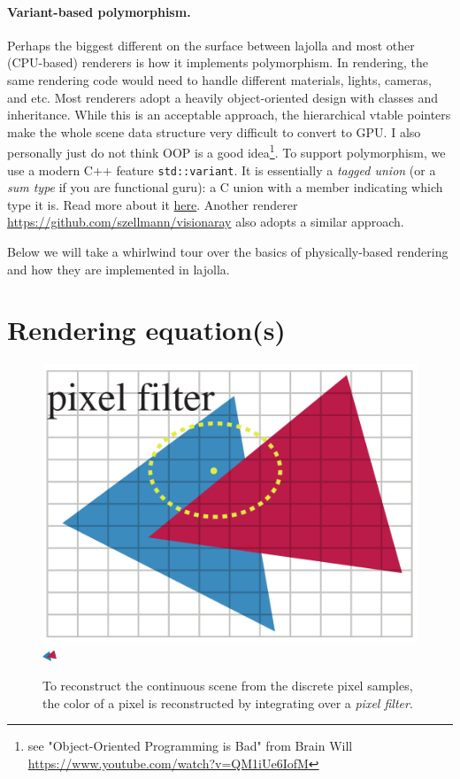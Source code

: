 \documentclass{article}
\begin{document}
\paragraph{Variant-based polymorphism.} Perhaps the biggest different on the surface between lajolla and most other (CPU-based) renderers is how it implements polymorphism. In rendering, the same rendering code would need to handle different materials, lights, cameras, and etc. Most renderers adopt a heavily object-oriented design with classes and inheritance. While this is an acceptable approach, the hierarchical vtable pointers make the whole scene data structure very difficult to convert to GPU. I also personally just do not think OOP is a good idea\footnote{see "Object-Oriented Programming is Bad" from Brain Will \url{https://www.youtube.com/watch?v=QM1iUe6IofM}}. To support polymorphism, we use a modern C++ feature \lstinline{std::variant}. It is essentially a \emph{tagged union} (or a \emph{sum type} if you are functional guru): a C union with a member indicating which type it is. Read more about it \href{https://www.cppstories.com/2020/04/variant-virtual-polymorphism.html/}{here}. Another renderer \href{visionaray}{https://github.com/szellmann/visionaray} also adopts a similar approach.

Below we will take a whirlwind tour over the basics of physically-based rendering and how they are implemented in lajolla.

\section{Rendering equation(s)}
\begin{figure}[h]
    \centering
    \includegraphics[width=0.4\linewidth]{imgs/pixel_filter.pdf}
    \includegraphics[width=0.4\linewidth]{imgs/antialiasing.pdf}
    \caption{To reconstruct the continuous scene from the discrete pixel samples, the color of a pixel is reconstructed by integrating over a \emph{pixel filter}.}
    \label{fig:pixel_filter}
\end{figure}
\end{document}
